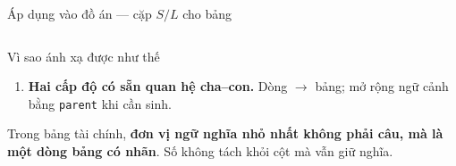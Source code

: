 \documentclass[aspectratio=169,10pt]{beamer}
\begin{document}
\begin{frame}{Áp dụng vào đồ án --- cặp $S/L$ cho bảng}
\begin{columns}[T]
\begin{column}{0.49\textwidth}
\begin{block}{\small Vì sao ánh xạ được như thế}
\begin{enumerate}
                tài chính không thể tách đơn vị bằng dấu câu --- một ô là một số.
          \item \textbf{Hai cấp độ có sẵn quan hệ cha--con.} Dòng $\to$ bảng; mở rộng
                ngữ cảnh bằng \texttt{parent} khi cần sinh.
        \end{enumerate}
      \end{block}
      \begin{keyidea}{\footnotesize Trong bảng tài chính, \textbf{đơn vị ngữ nghĩa nhỏ nhất
        không phải câu, mà là một dòng bảng có nhãn}. Số không tách khỏi cột mà vẫn giữ nghĩa.}
      \end{keyidea}
    \end{column}
  \end{columns}
\end{frame}
\end{document}
